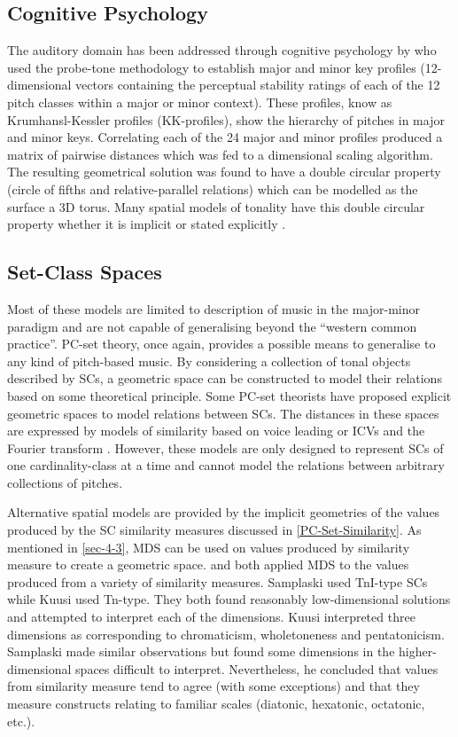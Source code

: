 \documentclass{article}
\begin{document}
\subsection{Cognitive Psychology}
\label{sec-5-3}

The auditory domain has been addressed through cognitive psychology by
\citet{Krumhansl1990} who used the probe-tone methodology
\citep{Krumhansl1979} to establish major and minor key profiles
(12-dimensional vectors containing the perceptual stability ratings of
each of the 12 pitch classes within a major or minor context). These
profiles, know as Krumhansl-Kessler profiles (KK-profiles), show the
hierarchy of pitches in major and minor keys. Correlating each of the
24 major and minor profiles produced a matrix of pairwise distances
which was fed to a dimensional scaling algorithm. The resulting
geometrical solution was found to have a double circular property
(circle of fifths and relative-parallel relations) which can be
modelled as the surface a 3D torus. Many spatial models of tonality
have this double circular property whether it is implicit
\citep{Weber,Schoenberg} or stated explicitly \citep{Lerdahl2001a}.
\subsection{Set-Class Spaces}
\label{sec-5-4}

Most of these models are limited to description of music in the
major-minor paradigm and are not capable of generalising beyond the
``western common practice''. PC-set theory, once again, provides a
possible means to generalise to any kind of pitch-based music. By
considering a collection of tonal objects described by SCs, a
geometric space can be constructed to model their relations based on
some theoretical principle. Some PC-set theorists have proposed
explicit geometric spaces to model relations between SCs. The
distances in these spaces are expressed by models of similarity based
on voice leading \citep{Cohn2003,Tymoczko2012} or ICVs and the Fourier
transform \citep{Quinn2006, Quinn2007}. However, these models are only
designed to represent SCs of one cardinality-class at a time and
cannot model the relations between arbitrary collections of pitches.

Alternative spatial models are provided by the implicit geometries of
the values produced by the SC similarity measures discussed in \ref{PC-Set-Similarity}. As mentioned in \ref{sec-4-3}, MDS can be
used on values produced by similarity measure to create a geometric
space. \citet{Kuusi2001} and \citet{Samplaski2005a} both applied MDS to
the values produced from a variety of similarity measures. Samplaski
used TnI-type SCs while Kuusi used Tn-type. They both found reasonably
low-dimensional solutions and attempted to interpret each of the
dimensions. Kuusi interpreted three dimensions as corresponding to
chromaticism, wholetoneness and pentatonicism. Samplaski made similar
observations but found some dimensions in the higher-dimensional
spaces difficult to interpret. Nevertheless, he concluded that values
from similarity measure tend to agree (with some exceptions) and that
they measure constructs relating to familiar scales (diatonic,
hexatonic, octatonic, etc.).
\end{document}
